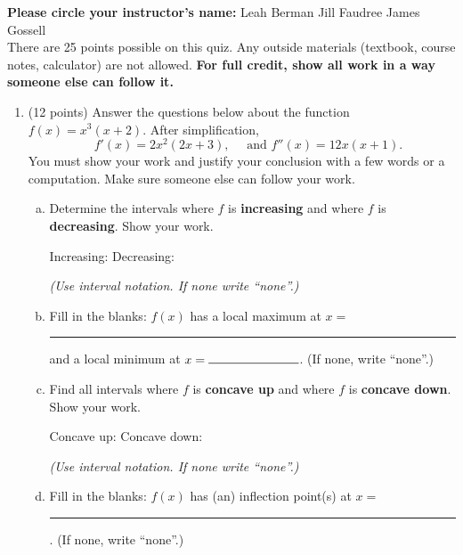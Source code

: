 \documentclass[12pt]{article}
\renewcommand{\emph}[1]{\textsf{\textbf{#1}}}
\newcounter{probcount}
\newcounter{subprobcount}
\newcommand{\problem}[1]{%
\par
\addvspace{4pt}%
\setcounter{subprobcount}{0}%
\stepcounter{probcount}%
\makebox[0pt][r]{\emph{\arabic{probcount}.}\hskip1ex}\emph{[#1 points]}\hskip1ex}
\newenvironment{subproblems}{%
\begin{enumerate}%
\setcounter{enumi}{\value{subprobcount}}%
\renewcommand{\theenumi}{\emph{\alph{enumi}}}}%
{\setcounter{subprobcount}{\value{enumi}}\end{enumerate}}
\newcommand{\blank}[1]{\rule{#1}{0.5pt}}
\newcommand{\ds}{\displaystyle}
\begin{document}
\emph{Please circle your instructor's name:} \hfill Leah Berman  \hfill   Jill Faudree \hfill James Gossell \\

There are 25 points possible on this quiz. Any outside materials (textbook, course notes, calculator) are not allowed.  \emph{For full credit, show all work in a way someone else can follow it.} 

\begin{enumerate}

\item (12 points) Answer the questions below about the function $\ds f(x)= x^{3}(x+2)$. After simplification, \[ \quad f'(x)= 2 x^2 (2 x+3), \quad \text{ and }  f''(x)= 12 x (x+1).\]
You must show your work and justify your conclusion with a few words or a computation. Make sure someone else can follow your work.

\begin{enumerate}[(a)]
	\item Determine the intervals where $f$ is \emph{increasing} and where $f$ is \emph{decreasing}. Show your work. 
	\vfill
	
	\vfill
	
	Increasing: \hrulefill Decreasing:\hrulefill	
	
	{\it (Use interval notation. If none write ``none''.)}
	
	\item Fill in the blanks: $f(x)$ has a local maximum at $x = $ \blank{1in}  and a local minimum at $x = \blank{1in} $. (If none, write ``none''.)
	

	\item Find all intervals where $f$ is \emph{concave up} and where $f$ is \emph{concave down}. Show your work.
	\vfill
	\vfill

	Concave up: \hrulefill Concave down:\hrulefill	
	
	{\it (Use interval notation. If none write ``none''.)}
	
	\item Fill in the blanks: $f(x)$ has (an) inflection point(s) at $x =$ \blank{1in}. (If none, write ``none''.)
	

\end{enumerate}
\newpage


\end{enumerate}
\end{document}
